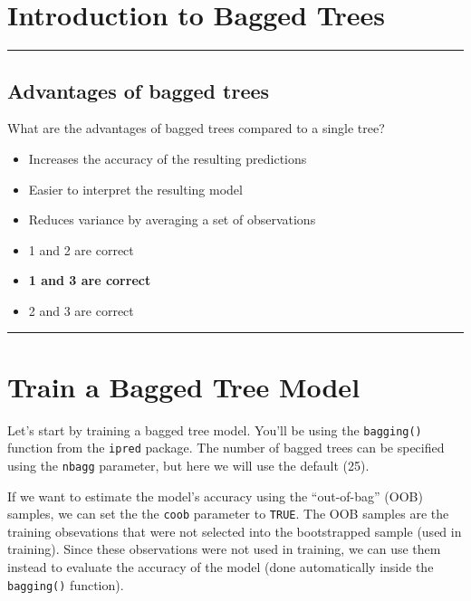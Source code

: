 \documentclass[
]{book}
\begin{document}
\hypertarget{introduction-to-bagged-trees}{%
\section{Introduction to Bagged Trees}\label{introduction-to-bagged-trees}}

\begin{center}\rule{0.5\linewidth}{0.5pt}\end{center}

\hypertarget{advantages-of-bagged-trees}{%
\subsection{Advantages of bagged trees}\label{advantages-of-bagged-trees}}

What are the advantages of bagged trees compared to a single tree?

\begin{itemize}
\item
  Increases the accuracy of the resulting predictions
\item
  Easier to interpret the resulting model
\item
  Reduces variance by averaging a set of observations
\item
  1 and 2 are correct
\item
  \textbf{1 and 3 are correct}
\item
  2 and 3 are correct
\end{itemize}

\begin{center}\rule{0.5\linewidth}{0.5pt}\end{center}

\hypertarget{train-a-bagged-tree-model}{%
\section{Train a Bagged Tree Model}\label{train-a-bagged-tree-model}}

Let's start by training a bagged tree model. You'll be using the \texttt{bagging()} function from the \texttt{ipred} package. The number of bagged trees can be specified using the \texttt{nbagg} parameter, but here we will use the default (25).

If we want to estimate the model's accuracy using the ``out-of-bag'' (OOB) samples, we can set the the \texttt{coob} parameter to \texttt{TRUE}. The OOB samples are the training obsevations that were not selected into the bootstrapped sample (used in training). Since these observations were not used in training, we can use them instead to evaluate the accuracy of the model (done automatically inside the \texttt{bagging()} function).
\end{document}
